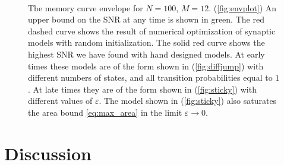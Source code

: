 \documentclass{article} %
\begin{document}
\begin{figure}
 \begin{center}
 \begin{myenuma}
 \parbox[t]{0.45\linewidth}{
  \item{}\label{fig:envplot}
  }\hp
  \parbox[t]{0.45\linewidth}{
  \item{}\label{fig:diffjump}\\[0.1\linewidth]
  \item{}\label{fig:sticky}
  }
 \end{myenuma}
 \end{center}
  \caption{The memory curve envelope for $N=100$, $M=12$.
  (\ref{fig:envplot}) An upper bound on the SNR at any time is shown in green.
  The red dashed curve shows the result of numerical optimization of synaptic models with random initialization.
  The solid red curve shows the highest SNR we have found with hand designed models.
  At early times these models are of the form shown in (\ref{fig:diffjump}) with different numbers of states, and all transition probabilities equal to $1$.
  At late times they are of the form shown in (\ref{fig:sticky}) with different values of $\varepsilon$.
  The model shown in (\ref{fig:sticky}) also saturates the area bound \eqref{eq:max_area} in the limit $\varepsilon\to0$.
  }\label{fig:env}
\end{figure}







\section{Discussion}\label{sec:disc}
\end{document}
